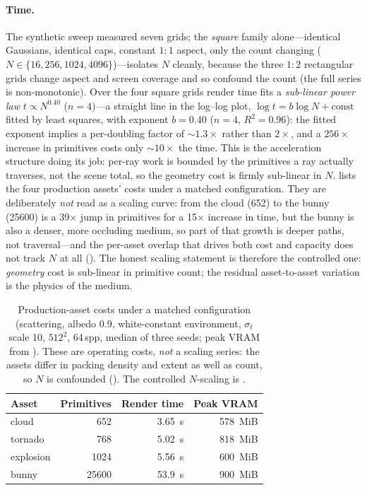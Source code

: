 \paragraph{Time.} The synthetic sweep measured seven grids; the \emph{square} family alone---identical
Gaussians, identical caps, constant \(1\!:\!1\) aspect, only the count changing
(\(N\in\{16,256,1024,4096\}\))---isolates \(N\) cleanly, because the three \(1\!:\!2\) rectangular grids
change aspect and screen coverage and so confound the count (the full series is non-monotonic). Over the
four square grids render time fits a \emph{sub-linear power law} \(t\propto N^{0.40}\) (\(n=4\))---a straight line in the
log--log plot, \(\log t = b\log N + \mathrm{const}\) fitted by least squares, with exponent \(b=0.40\)
(\(n=4\), \(R^2=0.96\)): the fitted exponent implies a per-doubling factor of \(\sim\!1.3\times\) rather
than \(2\times\), and a \(256\times\)
increase in primitives costs only \(\sim\!10\times\) the time. This is the acceleration structure doing its job: per-ray work is bounded
by the primitives a ray actually traverses, not the scene total, so the geometry cost is firmly
sub-linear in \(N\).  lists the four production assets' costs under a matched
configuration. They are deliberately \emph{not} read as a scaling curve: from the cloud (\num{652}) to
the bunny (\num{25600}) is a \num{39}\(\times\) jump in primitives for a \num{15}\(\times\) increase in
time, but the bunny is also a denser, more occluding medium, so part of that growth is deeper paths, not
traversal---and the per-asset overlap that drives both cost and capacity does not track \(N\) at all
(). The honest scaling statement is therefore the controlled one: \emph{geometry} cost
is sub-linear in primitive count; the residual asset-to-asset variation is the physics of the medium.

\begin{table}[htp]
  \centering
  \begin{tabular}{@{}lrrr@{}}
    \toprule
    Asset & Primitives & Render time & Peak VRAM \\
    \midrule
    cloud     & \num{652}   & \SI{3.65}{\second}  & \SI{578}{MiB} \\
    tornado   & \num{768}   & \SI{5.02}{\second}  & \SI{818}{MiB} \\
    explosion & \num{1024}  & \SI{5.56}{\second}  & \SI{600}{MiB} \\
    bunny     & \num{25600} & \SI{53.9}{\second}  & \SI{900}{MiB} \\
    \bottomrule
  \end{tabular}
  \caption{Production-asset costs under a matched configuration (scattering, albedo \num{0.9},
  white-constant environment, \(\sigma_t\) scale \num{10}, \(512^2\), \num{64}\,spp, median of three
  seeds; peak VRAM from ). These are operating costs, \emph{not} a scaling series: the
  assets differ in packing density and extent as well as count, so \(N\) is confounded
  (). The controlled \(N\)-scaling is .}
  \label{tab:asset-cost}
\end{table}

